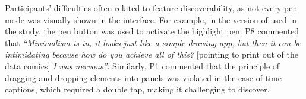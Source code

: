 

Participants' difficulties often related to feature discoverability, as not every pen mode was visually shown in the interface. For example, in the version of \toolname{} used in the study, the pen button was used to activate the highlight pen. P8 commented that \textit{``Minimalism is in, it looks just like a simple drawing app, but then it can be intimidating because how do you achieve all of this?} [pointing to print out of the data comics] \textit{I was nervous''}. Similarly, P1 commented that the principle of dragging and dropping elements into panels was violated in the case of time captions, which required a double tap, making it challenging to discover. 







